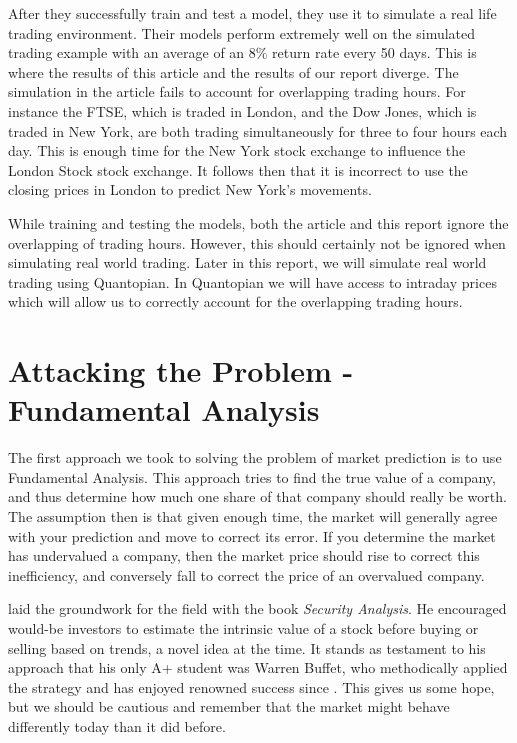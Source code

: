 \documentclass{report}
\begin{document}
After they successfully train and test a model, they use it to simulate a real life trading environment. Their models perform extremely well on the simulated trading example with an average of an 8\% return rate every 50 days. This is where the results of this article and the results of our report diverge. The simulation in the article fails to account for overlapping trading hours. For instance the FTSE, which is traded in London, and the Dow Jones, which is traded in New York, are both trading simultaneously for three to four hours each day. This is enough time for the New York stock exchange to influence the London Stock stock exchange. It follows then that it is incorrect to use the closing prices in London to predict New York's movements.

While training and testing the models, both the article and this report ignore the overlapping of trading hours. However, this should certainly not be ignored when simulating real world trading. Later in this report, we will simulate real world trading using Quantopian. In Quantopian we will have access to intraday prices which will allow us to correctly account for the overlapping trading hours.  

\chapter{Attacking the Problem - Fundamental Analysis}

The first approach we took to solving the problem of market prediction is to use Fundamental Analysis. This approach tries to find the true value of a company, and thus determine how much one share of that company should really be worth. The assumption then is that given enough time, the market will generally agree with your prediction and move to correct its error. If you determine the market has undervalued a company, then the market price should rise to correct this inefficiency, and conversely fall to correct the price of an overvalued company. 

\citet{graham1934security} laid the groundwork for the field with the book \textit{Security Analysis}. He encouraged would-be investors to estimate the intrinsic value of a stock before buying or selling based on trends, a novel idea at the time. It stands as testament to his approach that his only A+ student was Warren Buffet, who methodically applied the strategy and has enjoyed renowned success since \cite{schroeder2008snowball}. This gives us some hope, but we should be cautious and remember that the market might behave differently today than it did before.
\end{document}
